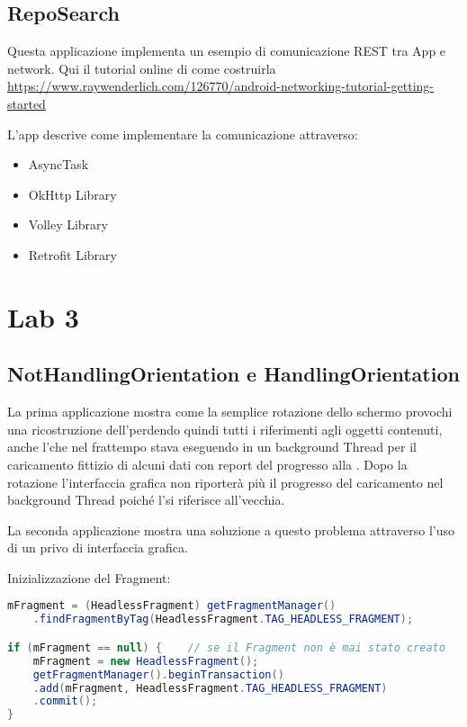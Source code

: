	\subsection{RepoSearch}
	Questa applicazione implementa un esempio di comunicazione REST tra App
e network. Qui il tutorial online di come costruirla
\url{
https://www.raywenderlich.com/126770/android-networking-tutorial-getting-started
}

L'app descrive come implementare la comunicazione attraverso:
\begin{itemize}
	\item AsyncTask
	\item OkHttp Library
	\item Volley Library
	\item Retrofit Library
\end{itemize}


\section{Lab 3}

\subsection{NotHandlingOrientation e HandlingOrientation}

La prima applicazione mostra come la semplice rotazione dello schermo provochi una ricostruzione dell'\Activity perdendo quindi tutti i riferimenti agli oggetti contenuti, anche l'\AsyncTask che nel frattempo stava eseguendo in un background Thread per il caricamento fittizio di alcuni dati  con report del progresso alla \View. Dopo la rotazione l'interfaccia grafica non riporterà più il progresso del caricamento nel background Thread poiché l'\AsyncTask si riferisce all'\Activity vecchia.

La seconda applicazione mostra una soluzione a questo problema attraverso l'uso di un \Fragment privo di interfaccia grafica.

Inizializzazione del Fragment:

\begin{lstlisting}[language=Java]
mFragment = (HeadlessFragment) getFragmentManager()
	.findFragmentByTag(HeadlessFragment.TAG_HEADLESS_FRAGMENT);

if (mFragment == null) {	// se il Fragment non è mai stato creato
	mFragment = new HeadlessFragment();
	getFragmentManager().beginTransaction()
	.add(mFragment, HeadlessFragment.TAG_HEADLESS_FRAGMENT)
	.commit();
}
\end{lstlisting}

